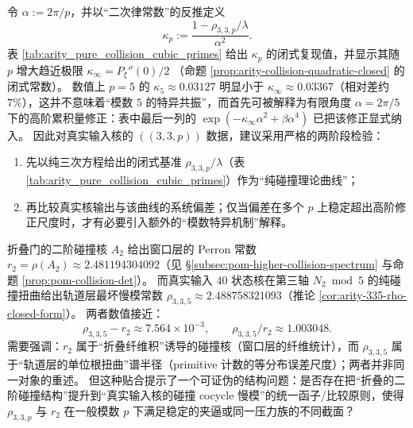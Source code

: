 \begin{remark}[两阶段可证伪检验：\texorpdfstring{$p=5$}{p=5} 的“经验二次律” vs \texorpdfstring{$\kappa_\infty$}{kappa_infty} 的“理论二次律”]\label{rem:arity-kappa-empirical-vs-theory}
令 \(\alpha:=2\pi/p\)，并以“二次律常数”的反推定义
\[
\kappa_p:=\frac{1-\rho_{3,3,p}/\lambda}{\alpha^2}.
\]
表 \ref{tab:arity_pure_collision_cubic_primes} 给出 \(\kappa_p\) 的闭式复现值，并显示其随 \(p\) 增大趋近极限
\(
\kappa_\infty=P_\xi''(0)/2
\)
（命题 \ref{prop:arity-collision-quadratic-closed} 的闭式常数）。
数值上 \(p=5\) 的 \(\kappa_5\approx 0.03127\) 明显小于 \(\kappa_\infty\approx 0.03367\)（相对差约 \(7\%\)），这并不意味着“模数 \(5\) 的特异共振”，而首先可被解释为有限角度 \(\alpha=2\pi/5\) 下的高阶累积量修正：表中最后一列的 \(\exp(-\kappa_\infty\alpha^2+\beta\alpha^4)\) 已把该修正显式纳入。
因此对真实输入核的 \(((3,3,p))\) 数据，建议采用严格的两阶段检验：
\begin{enumerate}
  \item 先以纯三次方程给出的闭式基准 \(\rho_{3,3,p}/\lambda\)（表 \ref{tab:arity_pure_collision_cubic_primes}）作为“纯碰撞理论曲线”；
  \item 再比较真实核输出与该曲线的系统偏差；仅当偏差在多个 \(p\) 上稳定超出高阶修正尺度时，才有必要引入额外的“模数特异机制”解释。
\end{enumerate}
\end{remark}

\begin{remark}\label{rem:arity-335-r2-vs-rho}
折叠门的二阶碰撞核 \(A_2\) 给出窗口层的 Perron 常数 \(r_2=\rho(A_2)\approx 2.481194304092\)（见 \S\ref{subsec:pom-higher-collision-spectrum} 与命题 \ref{prop:pom-collision-det}）。
而真实输入 \(40\) 状态核在第三轴 \(N_2\bmod 5\) 的纯碰撞扭曲给出轨道层最坏慢模常数 \(\rho_{3,3,5}\approx 2.488758321093\)（推论 \ref{cor:arity-335-rho-closed-form}）。
两者数值接近：
\[
\rho_{3,3,5}-r_2\approx 7.564\times 10^{-3},
\qquad
\rho_{3,3,5}/r_2\approx 1.003048.
\]
需要强调：\(r_2\) 属于“折叠纤维积”诱导的碰撞核（窗口层的纤维统计），而 \(\rho_{3,3,5}\) 属于“轨道层的单位根扭曲”谱半径（primitive 计数的等分布误差尺度）；两者并非同一对象的重述。
但这种贴合提示了一个可证伪的结构问题：是否存在把“折叠的二阶碰撞结构”提升到“真实输入核的碰撞 cocycle 慢模”的统一函子/比较原则，使得 \(\rho_{3,3,p}\) 与 \(r_2\) 在一般模数 \(p\) 下满足稳定的夹逼或同一压力族的不同截面？
\end{remark}

